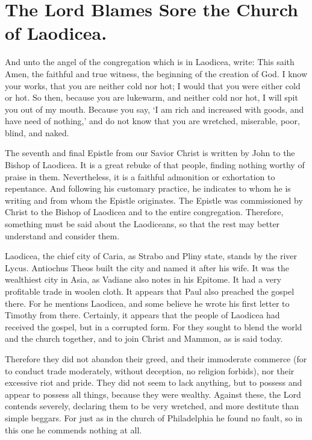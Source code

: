\chapter[Sermon 20. The Lord Blames Sore the Church of Laodicea.]{The Lord Blames Sore the Church of Laodicea.}
\label{sermon:020}

And unto the angel of the congregation which is in Laodicea, write: This saith Amen, the faithful and true witness, the beginning of the creation of God. I know your works, that you are neither cold nor hot; I would that you were either cold or hot. So then, because you are lukewarm, and neither cold nor hot, I will spit you out of my mouth. Because you say, ‘I am rich and increased with goods, and have need of nothing,’ and do not know that you are wretched, miserable, poor, blind, and naked.

The seventh and final Epistle from our Savior Christ is written by John to the Bishop of Laodicea. It is a great rebuke of that people, finding nothing worthy of praise in them. Nevertheless, it is a faithful admonition or exhortation to repentance. And following his customary practice, he indicates to whom he is writing and from whom the Epistle originates. The Epistle was commissioned by Christ to the Bishop of Laodicea and to the entire congregation. Therefore, something must be said about the Laodiceans, so that the rest may better understand and consider them.

Laodicea, the chief city of Caria, as Strabo and Pliny state, stands by the river Lycus. Antiochus Theos built the city and named it after his wife. It was the wealthiest city in Asia, as Vadiane also notes in his Epitome. It had a very profitable trade in woolen cloth. It appears that Paul also preached the gospel there. For he mentions Laodicea, and some believe he wrote his first letter to Timothy from there. Certainly, it appears that the people of Laodicea had received the gospel, but in a corrupted form. For they sought to blend the world and the church together, and to join Christ and Mammon, as is said today.

Therefore they did not abandon their greed, and their immoderate commerce (for to conduct trade moderately, without deception, no religion forbids), nor their excessive riot and pride. They did not seem to lack anything, but to possess and appear to possess all things, because they were wealthy. Against these, the Lord contends severely, declaring them to be very wretched, and more destitute than simple beggars. For just as in the church of Philadelphia he found no fault, so in this one he commends nothing at all.

